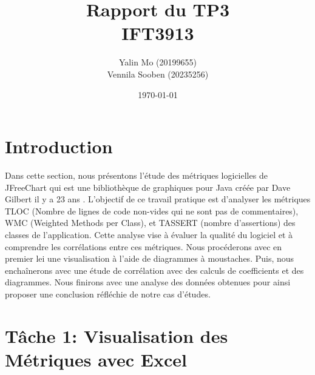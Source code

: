 \documentclass{proc}
\title{Rapport du TP3 \\ IFT3913}
\author{Yalin Mo (20199655) \\ Vennila Sooben (20235256)}
\date{\today}
\begin{document}
\maketitle

\section{Introduction}
Dans cette section, nous présentons l'étude des métriques logicielles de JFreeChart qui est une bibliothèque de graphiques pour Java créée par Dave Gilbert il y a 23 ans \cite{JFreeChart}. L'objectif de ce travail pratique est d'analyser les métriques TLOC (Nombre de lignes de code non-vides qui ne sont pas de commentaires), WMC (Weighted Methods per Class), et TASSERT (nombre d'assertions) des classes de l'application. Cette analyse vise à évaluer la qualité du logiciel et à comprendre les corrélations entre ces métriques. Nous procéderons avec en premier lei une visualisation à l'aide de diagrammes à moustaches. Puis, nous enchaînerons avec une étude de corrélation avec des calculs de coefficients et des diagrammes. Nous finirons avec une analyse des données obtenues pour ainsi proposer une conclusion réfléchie de notre cas d'études.
\vspace{-20px}
\section{Tâche 1: Visualisation des Métriques avec Excel}
\end{document}
